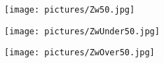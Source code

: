 \begin{figure}[h]
    \centering
    \begin{subfigure}{.4\textwidth}
        \centering
        \texttt{[image: pictures/Zw50.jpg]} \\
        \caption{}
    \end{subfigure}

    \begin{subfigure}{.4\textwidth}    
        \centering
        \texttt{[image: pictures/ZwUnder50.jpg]} \\
        \caption{}
    \end{subfigure}
    \hfill%
    \begin{subfigure}{.4\textwidth}
        \centering
        \texttt{[image: pictures/ZwOver50.jpg]} \\
        \caption{}
    \end{subfigure}
\end{figure}